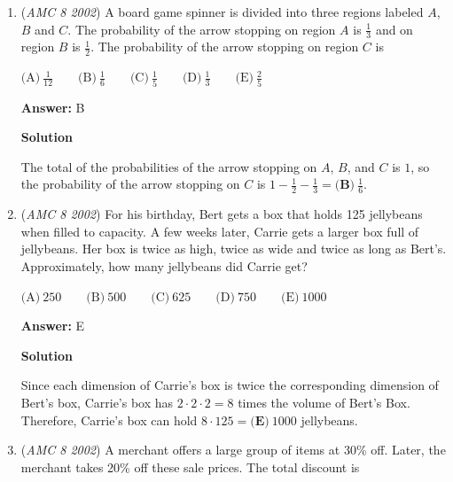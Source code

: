 \begin{enumerate}
 



\textbf{Solution 3}

As in solution 1, the seventh square as $7^2$ tiles while the sixth square has $6^2$ tiles.  Thus the seventh square has $7^2 - 6^2 = (7+6)(7-6) = 13 \cdot 1 = \boxed{\textbf{(C)}\ 13}$ more tiles than the sixth square.

 


	\item (\textit{AMC 8 2002}) A board game spinner is divided into three regions labeled $A$, $B$ and $C$. The probability of the arrow stopping on region $A$ is $\frac{1}{3}$ and on region $B$ is $\frac{1}{2}$. The probability of the arrow stopping on region $C$ is


 $\text{(A)}\ \frac{1}{12} \qquad \text{(B)}\ \frac{1}{6} \qquad \text{(C)}\ \frac{1}{5} \qquad \text{(D)}\ \frac{1}{3} \qquad \text{(E)}\ \frac{2}{5}$

 \textbf{Answer: }B



\textbf{Solution}

The total of the probabilities of the arrow stopping on $A$, $B$, and $C$ is $1$, so the probability of the arrow stopping on $C$ is $1-\frac{1}{2}-\frac{1}{3}=\boxed{\textbf{(B)}\ \frac16}$.

 


	\item (\textit{AMC 8 2002}) For his birthday, Bert gets a box that holds 125 jellybeans when filled to capacity. A few weeks later, Carrie gets a larger box full of jellybeans. Her box is twice as high, twice as wide and twice as long as Bert's. Approximately, how many jellybeans did Carrie get?


 $\text{(A)}\ 250 \qquad \text{(B)}\ 500 \qquad \text{(C)}\ 625 \qquad \text{(D)}\ 750 \qquad \text{(E)}\ 1000$

 \textbf{Answer: }E



\textbf{Solution}

Since each dimension of Carrie's box is twice the corresponding dimension of Bert's box, Carrie's box has $2 \cdot 2 \cdot 2 = 8$ times the volume of Bert's Box.  Therefore, Carrie's box can hold $8\cdot125=\boxed{\textbf{(E)}\ 1000}$ jellybeans.

 


	\item (\textit{AMC 8 2002}) A merchant offers a large group of items at 30\% off. Later, the merchant takes 20\% off these sale prices. The total discount is



\end{enumerate}
